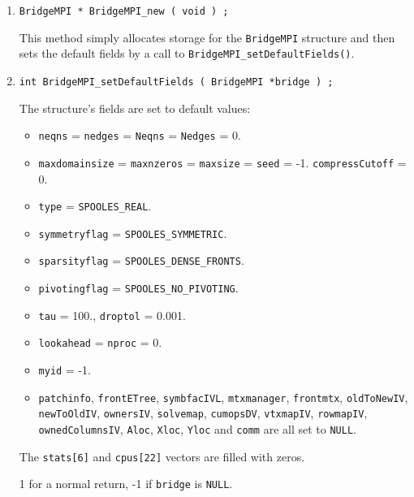 \begin{enumerate}
\item
\begin{verbatim}
BridgeMPI * BridgeMPI_new ( void ) ;
\end{verbatim}
This method simply allocates storage for the {\tt BridgeMPI} structure 
and then sets the default fields by a call to 
{\tt BridgeMPI\_setDefaultFields()}.
\item
\begin{verbatim}
int BridgeMPI_setDefaultFields ( BridgeMPI *bridge ) ;
\end{verbatim}
The structure's fields are set to default values:
\begin{itemize}
\item
\texttt{neqns} = \texttt{nedges} = \texttt{Neqns} =
\texttt{Nedges} = 0.
\item
\texttt{maxdomainsize} = \texttt{maxnzeros} 
   = \texttt{maxsize} = \texttt{seed} = -1.
\texttt{compressCutoff} = 0.
\item
\texttt{type} = \texttt{SPOOLES\_REAL}.
\item
\texttt{symmetryflag} = \texttt{SPOOLES\_SYMMETRIC}.
\item
\texttt{sparsityflag} = \texttt{SPOOLES\_DENSE\_FRONTS}.
\item
\texttt{pivotingflag} = \texttt{SPOOLES\_NO\_PIVOTING}.
\item
\texttt{tau} = 100., \texttt{droptol} = 0.001.
\item
\texttt{lookahead} = \texttt{nproc} = 0.
\item
\texttt{myid} = -1.
\item
\texttt{patchinfo},
\texttt{frontETree},
\texttt{symbfacIVL},
\texttt{mtxmanager},
\texttt{frontmtx},
\texttt{oldToNewIV},
\texttt{newToOldIV},
\texttt{ownersIV},
\texttt{solvemap},
\texttt{cumopsDV},
\texttt{vtxmapIV},
\texttt{rowmapIV},
\texttt{ownedColumnsIV},
\texttt{Aloc},
\texttt{Xloc},
\texttt{Yloc} and
\texttt{comm}
are all set to \texttt{NULL}.
\end{itemize}
The \texttt{stats[6]} and \texttt{cpus[22]} vectors are filled 
with zeros.
\par {}
1 for a normal return, -1 if \texttt{bridge} is \texttt{NULL}.

\end{enumerate}
